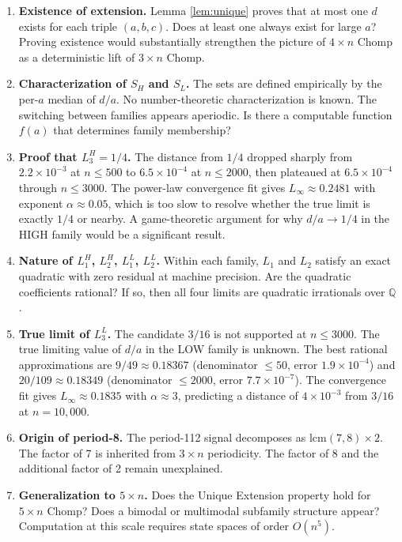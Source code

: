 \documentclass[12pt]{article}
\begin{document}
\begin{enumerate}

\item \textbf{Existence of extension.} Lemma \ref{lem:unique} proves
      that at most one $d$ exists for each triple $(a,b,c)$. Does
      at least one always exist for large $a$? Proving existence
      would substantially strengthen the picture of $4 \times n$
      Chomp as a deterministic lift of $3 \times n$ Chomp.

\item \textbf{Characterization of $S_H$ and $S_L$.} The sets are
      defined empirically by the per-$a$ median of $d/a$. No
      number-theoretic characterization is known. The switching
      between families appears aperiodic. Is there a computable
      function $f(a)$ that determines family membership?

\item \textbf{Proof that $L_3^H = 1/4$.} The distance from $1/4$
      dropped sharply from $2.2 \times 10^{-3}$ at $n \leq 500$ to
      $6.5 \times 10^{-4}$ at $n \leq 2000$, then plateaued at
      $6.5 \times 10^{-4}$ through $n \leq 3000$. The power-law
      convergence fit gives $L_\infty \approx 0.2481$ with exponent
      $\alpha \approx 0.05$, which is too slow to resolve whether the
      true limit is exactly $1/4$ or nearby. A game-theoretic argument
      for why $d/a \to 1/4$ in the HIGH family would be a significant result.

\item \textbf{Nature of $L_1^H$, $L_2^H$, $L_1^L$, $L_2^L$.}
      Within each family, $L_1$ and $L_2$ satisfy an exact quadratic
      with zero residual at machine precision. Are the quadratic
      coefficients rational? If so, then all four limits are
      quadratic irrationals over $\mathbb{Q}$.

\item \textbf{True limit of $L_3^L$.} The candidate $3/16$ is not
      supported at $n \leq 3000$. The true limiting value of $d/a$
      in the LOW family is unknown. The best rational approximations
      are $9/49 \approx 0.18367$ (denominator $\leq 50$, error $1.9\times10^{-4}$)
      and $20/109 \approx 0.18349$ (denominator $\leq 2000$, error
      $7.7\times10^{-7}$). The convergence fit gives $L_\infty \approx 0.1835$
      with $\alpha \approx 3$, predicting a distance of $4\times10^{-3}$
      from $3/16$ at $n=10{,}000$.

\item \textbf{Origin of period-8.} The period-112 signal decomposes
      as $\mathrm{lcm}(7,8) \times 2$. The factor of 7 is inherited
      from $3 \times n$ periodicity. The factor of 8 and the
      additional factor of 2 remain unexplained.

\item \textbf{Generalization to $5 \times n$.} Does the Unique
      Extension property hold for $5 \times n$ Chomp? Does a bimodal
      or multimodal subfamily structure appear? Computation at this
      scale requires state spaces of order $O(n^5)$.

\end{enumerate}
\end{document}
